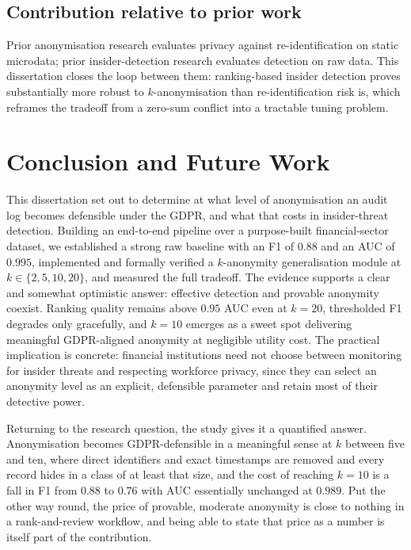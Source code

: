 \documentclass[10pt,a4paper]{article}
\begin{document}
\subsection{Contribution relative to prior work}
Prior anonymisation research \cite{sweeney2002,ldiversity2007,fung2010} evaluates privacy against re-identification on static microdata; prior insider-detection research \cite{homoliak2019,yuan2021,tuor2017} evaluates detection on raw data. This dissertation closes the loop between them: ranking-based insider detection proves substantially more robust to $k$-anonymisation than re-identification risk is, which reframes the tradeoff from a zero-sum conflict into a tractable tuning problem.

\section{Conclusion and Future Work}
This dissertation set out to determine at what level of anonymisation an audit log becomes defensible under the GDPR, and what that costs in insider-threat detection. Building an end-to-end pipeline over a purpose-built financial-sector dataset, we established a strong raw baseline with an F1 of $0.88$ and an AUC of $0.995$, implemented and formally verified a $k$-anonymity generalisation module at $k\in\{2,5,10,20\}$, and measured the full tradeoff. The evidence supports a clear and somewhat optimistic answer: effective detection and provable anonymity coexist. Ranking quality remains above $0.95$ AUC even at $k=20$, thresholded F1 degrades only gracefully, and $k=10$ emerges as a sweet spot delivering meaningful GDPR-aligned anonymity at negligible utility cost. The practical implication is concrete: financial institutions need not choose between monitoring for insider threats and respecting workforce privacy, since they can select an anonymity level as an explicit, defensible parameter and retain most of their detective power.

Returning to the research question, the study gives it a quantified answer. Anonymisation becomes GDPR-defensible in a meaningful sense at $k$ between five and ten, where direct identifiers and exact timestamps are removed and every record hides in a class of at least that size, and the cost of reaching $k=10$ is a fall in F1 from $0.88$ to $0.76$ with AUC essentially unchanged at $0.989$. Put the other way round, the price of provable, moderate anonymity is close to nothing in a rank-and-review workflow, and being able to state that price as a number is itself part of the contribution.
\end{document}

